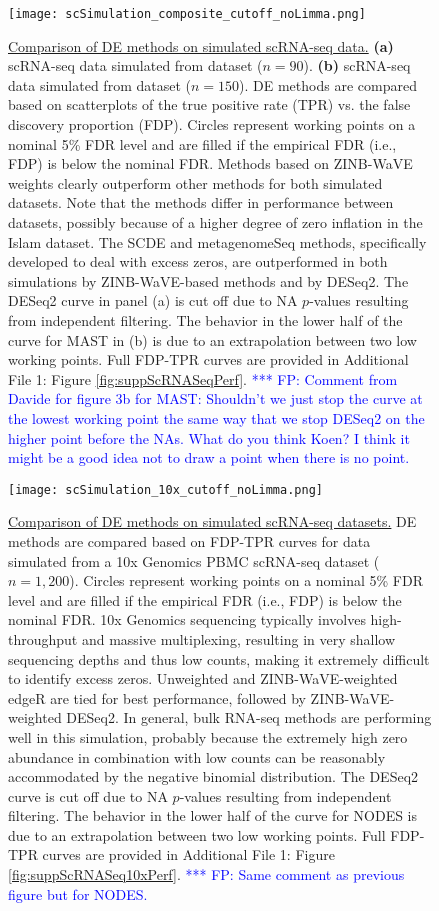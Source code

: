 \documentclass{bmcart}
\newcommand{\RPack}[1]{\textsf{#1}}
\newcommand{\fanny}[1]{\textcolor{blue}{*** FP: #1}}
\begin{document}
\begin{figure}[h!]
	\center
	\texttt{[image: scSimulation\_composite\_cutoff\_noLimma.png]}
	\caption{\underline{Comparison of DE methods on simulated scRNA-seq data.}
	\textbf{(a)} scRNA-seq data simulated from \citet{Islam2011} dataset ($n=90$). 
	\textbf{(b)} scRNA-seq data simulated from \citet{Trapnell2013} dataset ($n=150$).
DE methods are compared based on scatterplots of the true positive rate (TPR) vs. the false discovery proportion (FDP). Circles represent working points on a nominal 5\% FDR level and are filled if the empirical FDR (i.e., FDP) is below the nominal FDR.
Methods based on ZINB-WaVE weights clearly outperform other methods for both simulated datasets. Note that the methods differ in performance between datasets, possibly because of a higher degree of zero inflation in the Islam dataset. The \RPack{SCDE} and \RPack{metagenomeSeq} methods, specifically developed to deal with excess zeros, are outperformed in both simulations by ZINB-WaVE-based methods and by \RPack{DESeq2}. The \RPack{DESeq2} curve in panel (a) is cut off due to NA $p$-values resulting from independent filtering. 
The behavior in the lower half of the curve for \RPack{MAST} in (b) is due to an extrapolation between two low working points. 
Full FDP-TPR curves are provided in Additional File 1: Figure \ref{fig:suppScRNASeqPerf}. \fanny{Comment from Davide for figure 3b for MAST:  Shouldn’t we just stop the curve at the lowest working point the same way that we stop DESeq2 on the higher point before the NAs. What do you think Koen? I think it might be a good idea not to draw a point when there is no point.}} 
	\label{fig:scRNASeqPerf}
\end{figure}


\begin{figure}[h!]
	\center
	\texttt{[image: scSimulation\_10x\_cutoff\_noLimma.png]}
	\caption{\underline{Comparison of DE methods on simulated scRNA-seq datasets.} 
DE methods are compared based on FDP-TPR curves for data simulated from a 10x Genomics PBMC scRNA-seq dataset ($n=1,200$). 
Circles represent working points on a nominal 5\% FDR level and are filled if the empirical FDR (i.e., FDP) is below the nominal FDR.
10x Genomics sequencing typically involves high-throughput and massive multiplexing, resulting in very shallow sequencing depths and thus low counts, making it extremely difficult to identify excess zeros. Unweighted and ZINB-WaVE-weighted \RPack{edgeR} are tied for best performance, followed by ZINB-WaVE-weighted \RPack{DESeq2}. In general, bulk RNA-seq methods are performing well in this simulation, probably because the extremely high zero abundance in combination with low counts can be reasonably accommodated by the negative binomial distribution. 
The \RPack{DESeq2} curve is cut off due to NA $p$-values resulting from independent filtering. 
The behavior in the lower half of the curve for \RPack{NODES} is due to an extrapolation between two low working points. 
Full FDP-TPR curves are provided in Additional File 1: Figure \ref{fig:suppScRNASeq10xPerf}. \fanny{Same comment as previous figure but for NODES.}} 
	\label{fig:scRNASeq10xPerf}
\end{figure}
\end{document}

